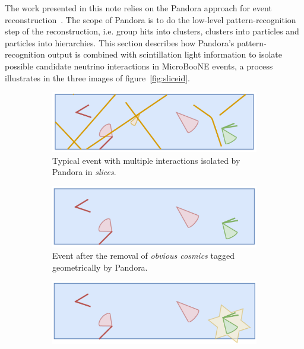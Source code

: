 
The work presented in this note relies on the Pandora approach for event reconstruction~\cite{bib:pandoraub}. The scope of Pandora is to do the low-level pattern-recognition step of the reconstruction, i.e. group hits into clusters, clusters into particles and particles into hierarchies. This section describes how Pandora's pattern-recognition output is combined with scintillation light information to isolate possible candidate neutrino interactions in MicroBooNE events, a process illustrates in the three images of figure~\ref{fig:sliceid}. 

\begin{figure}[ht] 
\begin{center}
    \begin{subfigure}[b]{0.7\textwidth}
    \centering
    \includegraphics[width=1.00\textwidth]{NuId-Ch2/Images/slice00.png}
    \caption{\label{fig:slcieid:00} Typical event with multiple interactions isolated by Pandora in \emph{slices}.}
    \end{subfigure}
    \begin{subfigure}[b]{0.7\textwidth}
    \centering
    \includegraphics[width=1.00\textwidth]{NuId-Ch2/Images/slice01.png}
    \caption{\label{fig:slcieid:01} Event after the removal of \emph{obvious cosmics} tagged geometrically by Pandora.}
    \end{subfigure}
    \begin{subfigure}[b]{0.7\textwidth}
    \centering
    \includegraphics[width=1.00\textwidth]{NuId-Ch2/Images/slice02.png}

\end{subfigure}
\end{center}
\end{figure}
